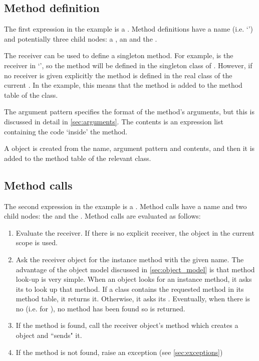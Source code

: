 \subsection{Method definition}

The first expression in the example is a . Method definitions have a name (i.e. `') and potentially three child nodes: a , an  and the .

The receiver can be used to define a singleton method. For example,  is the receiver in `', so the  method will be defined in the singleton class of . However, if no receiver is given explicitly the method is defined in the real class of the current . In the example, this means that the  method is added to the method table of the  class.

The argument pattern specifies the format of the method's arguments, but this is discussed in detail in \autoref{sec:arguments}. The contents is an expression list containing the code `inside' the method.

A  object is created from the name, argument pattern and contents, and then it is added to the method table of the relevant class.

\subsection{Method calls}

The second expression in the example is a . Method calls have a name and two child nodes: the  and the . Method calls are evaluated as follows:

\begin{enumerate}
  \item Evaluate the receiver. If there is no explicit receiver, the  object in the current scope is used.
  \item Ask the receiver object for the instance method with the given name. The advantage of the object model discussed in \autoref{sec:object_model} is that method look-up is very simple. When an object looks for an instance method, it asks its  to look up that method. If a class contains the requested method in its method table, it returns it. Otherwise, it asks its . Eventually, when there is no  (i.e. for ), no method has been found so  is returned.
  \item If the method is found, call the receiver object's  method which creates a  object and \linebreak ``sends" it.
  \item If the method is not found, raise an exception (see \autoref{sec:exceptions})
\end{enumerate}

